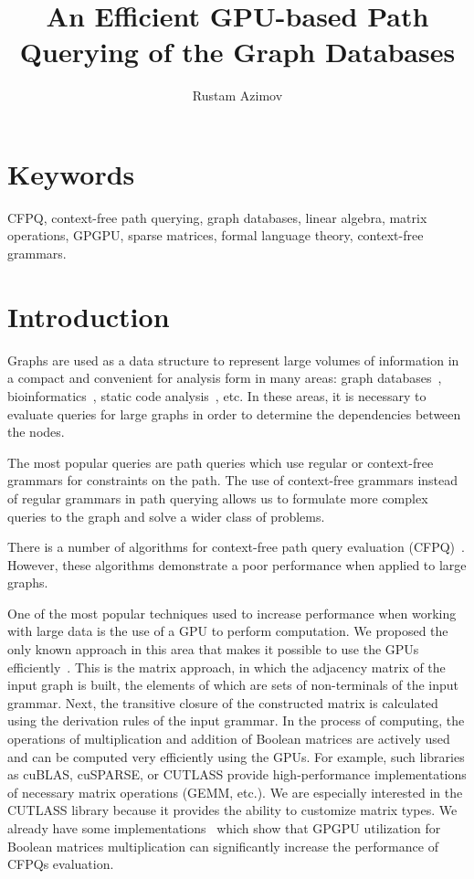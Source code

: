 \documentclass[12pt]{article}  %
\title{An Efficient GPU-based Path Querying of the Graph Databases}
\author{Rustam Azimov}
\date{}
\theoremstyle{remark}
\begin{document}

\maketitle

\section*{Keywords}
CFPQ, context-free path querying, graph databases, linear algebra, matrix operations, GPGPU, sparse matrices, formal language theory, context-free grammars.

\section{Introduction}
Graphs are used as a data structure to represent large volumes of information in a compact and convenient for analysis form in many areas: graph databases~\cite{redis,graphDB, kuijpers2019experimental}, bioinformatics~\cite{have2013graph, GraphQueryWithEarley}, static code analysis~\cite{kodumal2004set, zhang2013fast}, etc. In these areas, it is necessary to evaluate queries for large graphs in order to determine the dependencies between the nodes. 

The most popular queries are path queries which use regular or context-free grammars for constraints on the path. 
The use of context-free grammars instead of regular grammars in path querying allows us to formulate more complex queries to the graph and solve a wider class of problems.

There is a number of algorithms for context-free path query evaluation (CFPQ)~\cite{GraphQueryWithEarley, GLL, hellingsRelational, RDF}. 
However, these algorithms demonstrate a poor performance when applied to large graphs.

One of the most popular techniques used to increase performance when working with large data is the use of a GPU to perform computation. 
We proposed the only known approach in this area that makes it possible to use the GPUs efficiently~\cite{azimov2018context}. 
This is the matrix approach, in which the adjacency matrix of the input graph is built, the elements of which are sets of non-terminals of the input grammar. Next, the transitive closure of the constructed matrix is calculated using the derivation rules of the input grammar. In the process of computing, the operations of multiplication and addition of Boolean matrices are actively used and can be computed very efficiently using the GPUs. For example, such libraries as cuBLAS, cuSPARSE, or CUTLASS provide high-performance implementations of necessary matrix operations (GEMM, etc.). We are especially interested in the CUTLASS library because it provides the ability to customize matrix types. We already have some implementations~\cite{mishin2019evaluation} which show that GPGPU utilization for Boolean matrices multiplication can significantly increase the performance of CFPQs evaluation.
\end{document}
